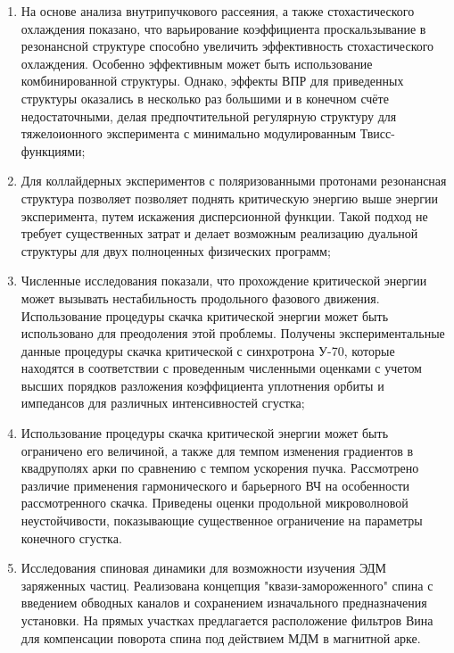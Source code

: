 \begin{enumerate}

  \item На основе анализа внутрипучкового рассеяния, а также стохастического охлаждения показано, что варьирование коэффициента проскальзывание в резонансной структуре способно увеличить эффективность стохастического охлаждения. Особенно эффективным может быть использование комбинированной структуры. Однако, эффекты ВПР для приведенных структуры оказались в несколько раз большими и в конечном счёте недостаточными, делая предпочтительной регулярную структуру для тяжелоионного эксперимента с минимально модулированным Твисс-функциями;
  
  \item Для коллайдерных экспериментов с поляризованными протонами резонансная структура позволяет позволяет поднять критическую энергию выше энергии эксперимента, путем искажения дисперсионной функции. Такой подход не требует существенных затрат и делает возможным реализацию дуальной структуры для двух полноценных физических программ;
  
  \item Численные исследования показали, что прохождение критической энергии может вызывать нестабильность продольного фазового движения. Использование процедуры скачка критической энергии может быть использовано для преодоления этой проблемы. Получены экспериментальные данные процедуры скачка критической с синхротрона У-70, которые находятся в соответствии с проведенным численными оценками с учетом высших порядков разложения коэффициента уплотнения орбиты и импедансов для различных интенсивностей сгустка;
  
  \item Использование процедуры скачка критической энергии может быть ограничено его величиной, а также для темпом изменения градиентов в квадруполях арки по сравнению с темпом ускорения пучка. Рассмотрено различие применения гармонического и барьерного ВЧ на особенности рассмотренного скачка. Приведены оценки продольной микроволновой неустойчивости, показывающие существенное ограничение на параметры конечного сгустка.
  
  \item Исследования спиновая динамики для возможности изучения ЭДМ заряженных частиц. Реализована концепция "квази-замороженного" спина с введением обводных каналов и сохранением изначального предназначения установки. На прямых участках предлагается расположение фильтров Вина для компенсации поворота спина под действием МДМ в магнитной арке.
  

\end{enumerate}
